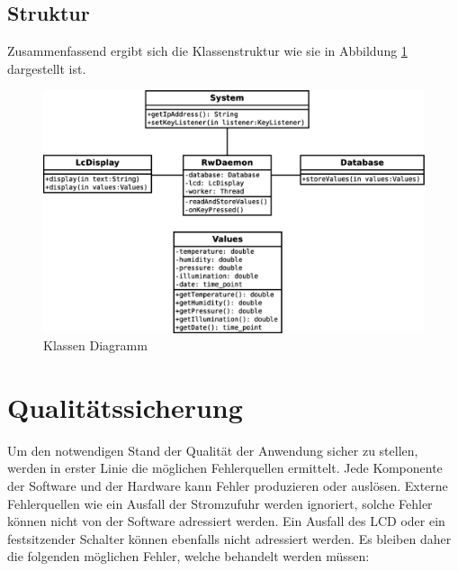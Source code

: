 \documentclass[
    10pt,
    a4paper,
]{scrartcl}
\begin{document}
\subsection{Struktur}


Zusammenfassend ergibt sich die Klassenstruktur wie sie in Abbildung
\ref{fig:class-diagram} dargestellt ist.

\begin{figure}[ht]
    \centering
    \includegraphics[width=\textwidth]{class-diagram.eps}
    \caption{Klassen Diagramm}
    \label{fig:class-diagram}
\end{figure}

\section{Qualitätssicherung}
Um den notwendigen Stand der Qualität der Anwendung sicher zu stellen, werden in erster
Linie die möglichen Fehlerquellen ermittelt. Jede Komponente der Software und der Hardware
kann Fehler produzieren oder auslösen. Externe Fehlerquellen wie ein Ausfall der
Stromzufuhr werden ignoriert, solche Fehler können nicht von der Software adressiert
werden. Ein Ausfall des LCD oder ein festsitzender Schalter können ebenfalls nicht
adressiert werden.  Es bleiben daher die folgenden möglichen Fehler, welche behandelt
werden müssen:
\end{document}
